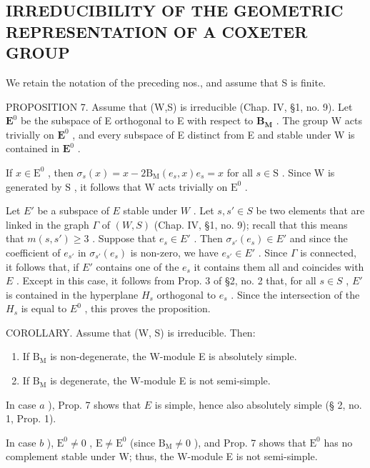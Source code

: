 \subsection{IRREDUCIBILITY OF THE GEOMETRIC REPRESENTATION OF A COXETER GROUP}

We retain the notation of the preceding nos., and assume that S is finite.

PROPOSITION 7. Assume that (W,S) is irreducible (Chap. IV, §1, no. 9). Let \(\mathbf{E}^0\) be the subspace of E orthogonal to E with respect to \(\mathbf{B}_{\mathbf{M}}\) . The group W acts trivially on \(\mathbf{E}^0\) , and every subspace of E distinct from E and stable under W is contained in \(\mathbf{E}^0\) .

If \(x \in \mathrm{E}^0\) , then \(\sigma_s(x) = x - 2\mathrm{B}_{\mathrm{M}}(e_s, x)e_s = x\) for all \(s \in \mathrm{S}\) . Since \(\mathrm{W}\) is generated by \(\mathrm{S}\) , it follows that \(\mathrm{W}\) acts trivially on \(\mathrm{E}^0\) .

Let \(E'\) be a subspace of \(E\) stable under \(W\) . Let \(s, s' \in S\) be two elements that are linked in the graph \(\Gamma\) of \((W, S)\) (Chap. IV, §1, no. 9); recall that this means that \(m(s, s') \geqslant 3\) . Suppose that \(e_s \in E'\) . Then \(\sigma_{s'}(e_s) \in E'\) and since the coefficient of \(e_{s'}\) in \(\sigma_{s'}(e_s)\) is non-zero, we have \(e_{s'} \in E'\) . Since \(\Gamma\) is connected, it follows that, if \(E'\) contains one of the \(e_s\) it contains them all and coincides with \(E\) . Except in this case, it follows from Prop. 3 of §2, no. 2 that, for all \(s \in S\) , \(E'\) is contained in the hyperplane \(H_s\) orthogonal to \(e_s\) . Since the intersection of the \(H_s\) is equal to \(E^0\) , this proves the proposition.

COROLLARY. Assume that (W, S) is irreducible. Then:

\begin{enumerate}
\def\labelenumi{\alph{enumi})}
\item
  If \(\mathrm{B_M}\) is non-degenerate, the W-module E is absolutely simple.
\item
  If \(\mathrm{B_M}\) is degenerate, the W-module E is not semi-simple.
\end{enumerate}

In case \(a\) ), Prop. 7 shows that \(E\) is simple, hence also absolutely simple (§ 2, no. 1, Prop. 1).

In case \(b\) ), \(\mathrm{E}^0 \neq 0\) , \(\mathrm{E} \neq \mathrm{E}^0\) (since \(\mathrm{B}_{\mathrm{M}} \neq 0\) ), and Prop. 7 shows that \(\mathrm{E}^0\) has no complement stable under W; thus, the W-module E is not semi-simple.

